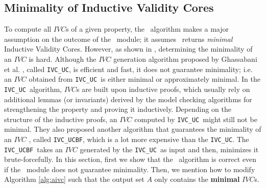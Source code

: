 \subsection{Minimality of Inductive Validity Cores}
\label{subsec:minimality}
\newcommand{\ucalg}{\texttt{\small{IVC\_UC}}}
\newcommand{\ucbfalg}{\texttt{\small{IVC\_UCBF}}}

To compute all $IVC$s of a given property, the \aivcalg ~algorithm
 makes a major assumption on the outcome of the \getivc ~module;
it assumes \getivc ~returns \emph{minimal} Inductive Validity Cores. 
However, as shown in \cite{Ghass16}, 
determining  the minimality of  an  $IVC$ is  hard. Although the $IVC$ generation algorithm proposed by Ghassabani et al. \cite{Ghass16}, called \ucalg ,
is efficient and fast, it does not guarantee minimality;
i.e. an $IVC$ obtained from \ucalg ~is either minimal or approximately minimal.
In the \ucalg ~algorithm, $IVC$s are built upon inductive proofs,
which usually rely on additional
lemmas (or invariants) derived by the model checking algorithms
for strengthening the property and proving it
inductively.
Depending on the structure of the inductive
proofs, an $IVC$ computed by \ucalg ~might still not be minimal.
They also proposed another algorithm that guarantees
the minimality of an $IVC$ \cite{Ghass16}, called \ucbfalg, which is a lot more expensive than the \ucalg. The \ucbfalg ~takes an $IVC$ generated by
the \ucalg ~as input and then, minimizes it brute-forcefully. In this section,
first we show that the \aivcalg ~algorithm is correct even if
 the \getivc ~module does not guarantee minimality.
Then, we mention how to modify Algorithm \ref{alg:aivc}
 such that the output set $A$ only contains the \textbf{minimal} $IVC$s.


